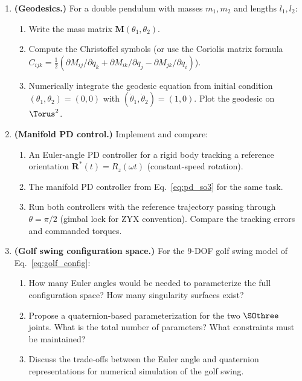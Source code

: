 \documentclass[12pt, openany]{book}
\theoremstyle{plain}
\begin{document}
\begin{enumerate}[label=\textbf{3.\arabic*.}, leftmargin=1.5cm]
\item \textbf{(Geodesics.)} For a double pendulum with masses $m_1, m_2$ and
  lengths $l_1, l_2$:
  \begin{enumerate}[label=(\alph*)]
    \item Write the mass matrix $\bm{M}(\theta_1, \theta_2)$.
    \item Compute the Christoffel symbols (or use the Coriolis matrix formula
      $C_{ijk} = \frac{1}{2}(\partial M_{ij}/\partial q_k +
      \partial M_{ik}/\partial q_j - \partial M_{jk}/\partial q_i)$).
    \item Numerically integrate the geodesic equation from initial condition
      $(\theta_1, \theta_2) = (0, 0)$ with $(\dot{\theta}_1, \dot{\theta}_2) = (1, 0)$.
      Plot the geodesic on $\Torus^2$.
  \end{enumerate}

\item \textbf{(Manifold PD control.)} Implement and compare:
  \begin{enumerate}[label=(\alph*)]
    \item An Euler-angle PD controller for a rigid body tracking a reference
      orientation $\bm{R}^*(t) = R_z(\omega t)$ (constant-speed rotation).
    \item The manifold PD controller from Eq.~\eqref{eq:pd_so3} for the
      same task.
    \item Run both controllers with the reference trajectory passing through
      $\theta = \pi/2$ (gimbal lock for ZYX convention). Compare the
      tracking errors and commanded torques.
  \end{enumerate}

\item \textbf{(Golf swing configuration space.)} For the 9-DOF golf swing
  model of Eq.~\eqref{eq:golf_config}:
  \begin{enumerate}[label=(\alph*)]
    \item How many Euler angles would be needed to parameterize the full
      configuration space? How many singularity surfaces exist?
    \item Propose a quaternion-based parameterization for the two $\SOthree$
      joints. What is the total number of parameters? What constraints
      must be maintained?
    \item Discuss the trade-offs between the Euler angle and quaternion
      representations for numerical simulation of the golf swing.
  \end{enumerate}

\end{enumerate}
\end{document}
